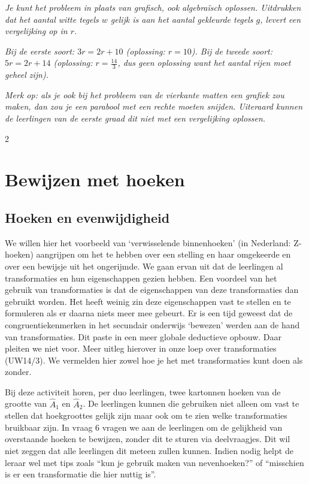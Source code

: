 \begin{werktekstoef}
\emph{Je kunt het probleem in plaats van grafisch, ook algebraïsch oplossen. Uitdrukken dat het aantal witte tegels $w$ gelijk is aan het aantal gekleurde tegels $g$, levert een vergelijking op in $r$.}

\emph{Bij de eerste soort: $3r=2r+10$ (oplossing: $r=10$). Bij de tweede soort: $5r=2r+14$ (oplossing: $r=\frac{14}{3}$, dus geen oplossing want het aantal rijen moet geheel zijn).}

\emph{Merk op: als je ook bij het probleem van de vierkante matten een grafiek zou maken, dan zou je een parabool met een rechte moeten snijden. Uiteraard kunnen de leerlingen van de eerste graad dit niet met een vergelijking oplossen.}

\end{werktekstoef}
\eindewerktekst

\begin{multicols} {2}

\section{Bewijzen met hoeken}
\subsection{Hoeken en evenwijdigheid}

We willen hier het voorbeeld van ‘verwisselende binnenhoeken’ (in Nederland: Z-hoeken) aangrijpen om het te hebben over een stelling en haar omgekeerde en over een bewijsje uit het ongerijmde. We gaan ervan uit dat de leerlingen al transformaties en hun eigenschappen gezien hebben. Een voordeel van het gebruik van transformaties is dat de eigenschappen van deze transformaties dan gebruikt worden. Het heeft weinig zin deze eigenschappen vast te stellen en te formuleren als er daarna niets meer mee gebeurt. Er is een tijd geweest dat de congruentiekenmerken in het secundair onderwijs ‘bewezen’ werden aan de hand van transformaties. Dit paste in een meer globale deductieve opbouw. Daar pleiten we niet voor. Meer uitleg hierover in onze loep over transformaties (UW14/3). We vermelden hier zowel hoe je het met transformaties kunt doen als zonder.

Bij deze activiteit horen, per duo leerlingen, twee kartonnen hoeken van de grootte van $\hat{A}_1$ en $\hat{A}_2$. De leerlingen kunnen die gebruiken niet alleen om vast te stellen dat hoekgroottes gelijk zijn maar ook om te zien welke transformaties bruikbaar zijn. In vraag 6 vragen we aan de leerlingen om de gelijkheid van overstaande hoeken te bewijzen, zonder dit te sturen via deelvraagjes. Dit wil niet zeggen dat alle leerlingen dit meteen zullen kunnen. Indien nodig helpt de leraar wel met tips zoals “kun je gebruik maken van nevenhoeken?” of “misschien is er een transformatie die hier nuttig is”.


\end{multicols}
